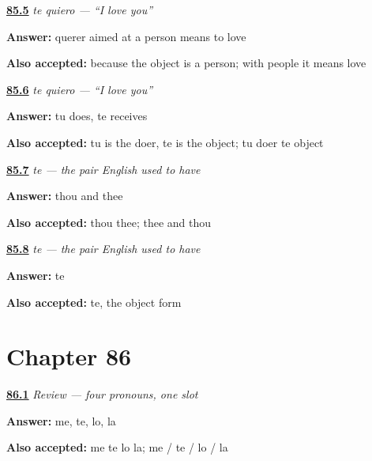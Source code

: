 \noindent\begin{minipage}[t]{\linewidth}
\raggedright
\hyperlink{review-ES-C42-te-meaning}{\textbf{85.5}} \emph{te quiero — \textquotedblleft{}I love you\textquotedblright{}}\par
\small \textbf{Answer:} querer aimed at a person means to love\par
\footnotesize \textbf{Also accepted:} because the object is a person; with people it means love
\end{minipage}\par\medskip

\noindent\begin{minipage}[t]{\linewidth}
\raggedright
\hyperlink{review-ES-C42-te-doer}{\textbf{85.6}} \emph{te quiero — \textquotedblleft{}I love you\textquotedblright{}}\par
\small \textbf{Answer:} tu does, te receives\par
\footnotesize \textbf{Also accepted:} tu is the doer, te is the object; tu doer te object
\end{minipage}\par\medskip

\noindent\begin{minipage}[t]{\linewidth}
\raggedright
\hyperlink{review-ES-C42-te-thee-pair}{\textbf{85.7}} \emph{te — the pair English used to have}\par
\small \textbf{Answer:} thou and thee\par
\footnotesize \textbf{Also accepted:} thou thee; thee and thou
\end{minipage}\par\medskip

\noindent\begin{minipage}[t]{\linewidth}
\raggedright
\hyperlink{review-ES-C42-te-thee-which}{\textbf{85.8}} \emph{te — the pair English used to have}\par
\small \textbf{Answer:} te\par
\footnotesize \textbf{Also accepted:} te, the object form
\end{minipage}\par\medskip

\section*{Chapter 86}

\noindent\begin{minipage}[t]{\linewidth}
\raggedright
\hyperlink{review-ES-C42-repaso-objeto-four}{\textbf{86.1}} \emph{Review — four pronouns, one slot}\par
\small \textbf{Answer:} me, te, lo, la\par
\footnotesize \textbf{Also accepted:} me te lo la; me / te / lo / la
\end{minipage}\par\medskip

